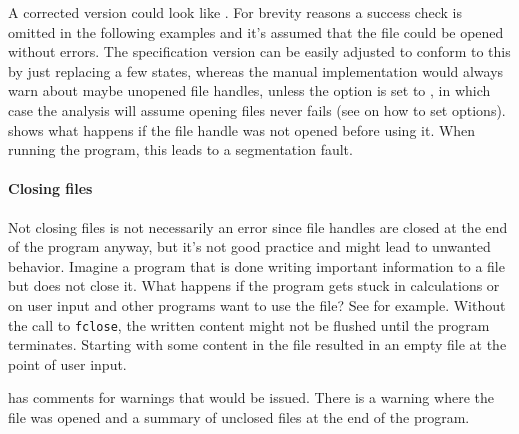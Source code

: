 A corrected version could look like .
For brevity reasons a success check is omitted in the following examples and it's assumed that the file could be opened without errors. The specification version can be easily adjusted to conform to this by just replacing a few states, whereas the manual implementation would always warn about maybe unopened file handles, unless the option  is set to , in which case the analysis will assume opening files never fails (see  on how to set options).
 shows what happens if the file handle was not opened before using it. When running the program, this leads to a segmentation fault.

\paragraph*{Closing files}
Not closing files is not necessarily an error since file handles are closed at the end of the program anyway, but it's not good practice and might lead to unwanted behavior.
Imagine a program that is done writing important information to a file but does not close it. What happens if the program gets stuck in calculations or on user input and other programs want to use the file? See  for example. Without the call to \verb|fclose|, the written content might not be flushed until the program terminates. Starting with some content in the file resulted in an empty file at the point of user input.

 has comments for warnings that would be issued. There is a warning where the file was opened and a summary of unclosed files at the end of the program.

